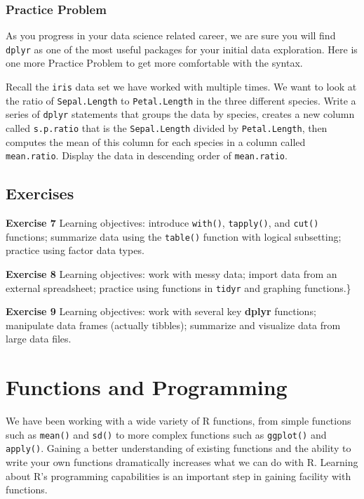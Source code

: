 \documentclass[
]{krantz}
\begin{document}
\hypertarget{practice-problem-10}{%
\subsection{Practice Problem}\label{practice-problem-10}}

As you progress in your data science related career, we are sure you will find \texttt{dplyr} as one of the most useful packages for your initial data exploration. Here is one more Practice Problem to get more comfortable with the syntax.

Recall the \texttt{iris} data set we have worked with multiple times. We want to look at the ratio of \texttt{Sepal.Length} to \texttt{Petal.Length} in the three different species. Write a series of \texttt{dplyr} statements that groups the data by species, creates a new column called \texttt{s.p.ratio} that is the \texttt{Sepal.Length} divided by \texttt{Petal.Length}, then computes the mean of this column for each species in a column called \texttt{mean.ratio}. Display the data in descending order of \texttt{mean.ratio}.

\hypertarget{exercises-3}{%
\section{Exercises}\label{exercises-3}}

\textbf{Exercise 7} Learning objectives: introduce \texttt{with()}, \texttt{tapply()}, and \texttt{cut()} functions; summarize data using the \texttt{table()} function with logical subsetting; practice using factor data types.

\textbf{Exercise 8} Learning objectives: work with messy data; import data from an external spreadsheet; practice using functions in \texttt{tidyr} and graphing functions.\}

\textbf{Exercise 9} Learning objectives: work with several key \textbf{dplyr} functions; manipulate data frames (actually tibbles); summarize and visualize data from large data files.

\hypertarget{functions}{%
\chapter{Functions and Programming}\label{functions}}

We have been working with a wide variety of R functions, from simple functions such as \texttt{mean()} and \texttt{sd()} to more complex functions such as \texttt{ggplot()} and \texttt{apply()}. Gaining a better understanding of existing functions and the ability to write your own functions dramatically increases what we can do with R. Learning about R's programming capabilities is an important step in gaining facility with functions.
\end{document}
